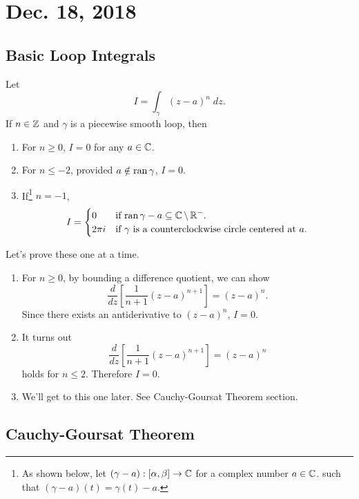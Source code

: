 \documentclass[notes]{subfile}
\begin{document}
\section{Dec. 18, 2018}
\subsection{Basic Loop Integrals}

\noindent
Let 
\[ I = \int_{\gamma} (z-a)^n \; dz. \]
If $n \in \operatorname{\mathbb{Z}}$ and $\gamma$  is a piecewise smooth loop, then
\begin{enumerate}
    \item For $n \ge 0$, $I = 0$ for any $a \in \operatorname{\mathbb{C}}$.
    \item For $n \le -2$, provided $a \notin \operatorname{ran}{\gamma}$,
        $I = 0$.
    \item If\footnote{As shown below, let $(\gamma - a): [\alpha, \beta] \to \operatorname{\mathbb{C}}$ for a complex number $a \in \operatorname{\mathbb{C}}$. 
                such that $(\gamma - a)(t) = \gamma(t) - a$.} $n = -1$,
        \[ I = \begin{cases}
                0 & \text{if $\operatorname{ran}{\gamma - a} \subseteq \operatorname{\mathbb{C}} \setminus \operatorname{\mathbb{R}}^-$.} \\
                2\pi i & \text{if $\gamma$ is a counterclockwise circle 
                centered at $a$.}
            \end{cases}
        \]
       
\end{enumerate}

Let's prove these one at a time.

\begin{enumerate}
    \item For $n \ge 0$, 
        by bounding a difference quotient, we can show
        \[ \frac{d}{dz} \left[ \frac{1}{n+1}(z-a)^{n+1}\right] =
        (z-a)^n. \]
        Since there exists an antiderivative to $(z-a)^n$,
        $I = 0$.
    \item It turns out
        \[ \frac{d}{dz} \left[ \frac{1}{n+1}(z-a)^{n+1}\right] =
        (z-a)^n \]
        holds for $n \le 2$.
        Therefore $I = 0$.
    \item We'll get to this one later.
        See Cauchy-Goursat Theorem section.
\end{enumerate}

\subsection{Cauchy-Goursat Theorem}
\end{document}
